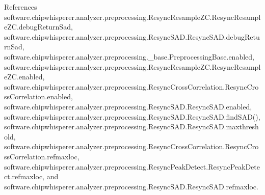 References software.\+chipwhisperer.\+analyzer.\+preprocessing.\+Resync\+Resample\+Z\+C.\+Resync\+Resample\+Z\+C.\+debug\+Return\+Sad, software.\+chipwhisperer.\+analyzer.\+preprocessing.\+Resync\+S\+A\+D.\+Resync\+S\+A\+D.\+debug\+Return\+Sad, software.\+chipwhisperer.\+analyzer.\+preprocessing.\+\_\+base.\+Preprocessing\+Base.\+enabled, software.\+chipwhisperer.\+analyzer.\+preprocessing.\+Resync\+Resample\+Z\+C.\+Resync\+Resample\+Z\+C.\+enabled, software.\+chipwhisperer.\+analyzer.\+preprocessing.\+Resync\+Cross\+Correlation.\+Resync\+Cross\+Correlation.\+enabled, software.\+chipwhisperer.\+analyzer.\+preprocessing.\+Resync\+S\+A\+D.\+Resync\+S\+A\+D.\+enabled, software.\+chipwhisperer.\+analyzer.\+preprocessing.\+Resync\+S\+A\+D.\+Resync\+S\+A\+D.\+find\+S\+A\+D(), software.\+chipwhisperer.\+analyzer.\+preprocessing.\+Resync\+S\+A\+D.\+Resync\+S\+A\+D.\+maxthreshold, software.\+chipwhisperer.\+analyzer.\+preprocessing.\+Resync\+Cross\+Correlation.\+Resync\+Cross\+Correlation.\+refmaxloc, software.\+chipwhisperer.\+analyzer.\+preprocessing.\+Resync\+Peak\+Detect.\+Resync\+Peak\+Detect.\+refmaxloc, and software.\+chipwhisperer.\+analyzer.\+preprocessing.\+Resync\+S\+A\+D.\+Resync\+S\+A\+D.\+refmaxloc.



